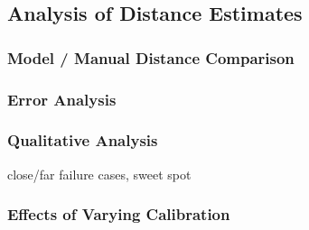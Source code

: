 \subsection{Analysis of Distance Estimates}

\subsubsection{Model / Manual Distance Comparison}

\subsubsection{Error Analysis}

\subsubsection{Qualitative Analysis}
close/far failure cases, sweet spot

\subsubsection{Effects of Varying Calibration}